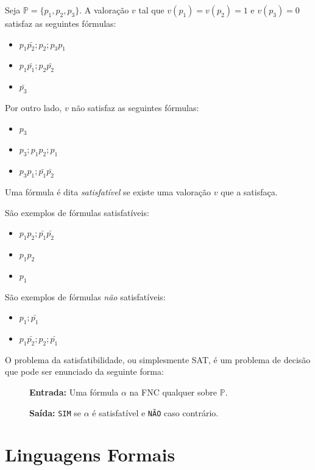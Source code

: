 \begin{example}
Seja $\mathbb{P} = \{p_1, p_2, p_3\}$. A valoração $v$ tal que $v(p_1) = v(p_2) = 1$ e $v(p_3) = 0$ satisfaz as seguintes fórmulas:

\begin{itemize}
\item[] $p_1\bar{p_2};p_2;p_3p_1$
\item[] $p_1\bar{p_1};p_2\bar{p_2}$
\item[] $\bar{p_3}$
\end{itemize}

Por outro lado, $v$ não satisfaz as seguintes fórmulas:
\begin{itemize}
\item[] $p_3$
\item[] $p_3;p_1p_2;p_1$
\item[] $p_3p_1;\bar{p_1}\bar{p_2}$
\end{itemize}
\end{example}

Uma fórmula é dita {\em satisfatível} se existe uma valoração $v$ que a satisfaça.


\begin{example}
  São exemplos de fórmulas satisfatíveis:
\begin{itemize}
\item[] $p_1p_2;\bar{p_1}\bar{p_2}$
\item[] $p_1p_2$
\item[] $p_1$
\end{itemize}

São exemplos de fórmulas {\em não} satisfatíveis:
\begin{itemize}
\item[] $p_1;\bar{p_1}$
\item[] $p_1\bar{p_2};p_2;\bar{p_1}$
\end{itemize}
\end{example}


O problema da satisfatibilidade, ou simplesmente SAT, é um problema de decisão que pode ser enunciado da seguinte forma:

  \begin{description}
  \item[] {\bf Entrada:} Uma fórmula $\alpha$ na FNC qualquer sobre $\mathbb{P}$.
  \item[] {\bf Saída:} {\tt SIM} se $\alpha$ é satisfatível e {\tt NÃO} caso contrário.
  \end{description}

\section{Linguagens Formais}
\label{sec:linguagens}

